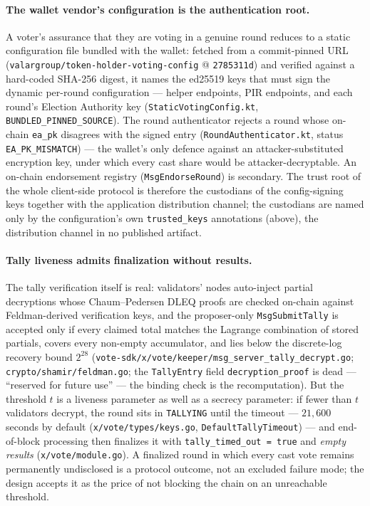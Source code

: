 \documentclass[11pt,a4paper]{article}
\theoremstyle{definition}
\begin{document}
\paragraph{The wallet vendor's configuration is the authentication root.}
A voter's assurance that they are voting in a genuine round reduces to a
static configuration file bundled with the wallet: fetched from a
commit-pinned URL (\texttt{valargroup/token-holder-voting-config} @
\texttt{2785311d}) and verified against a hard-coded SHA-256 digest, it
names the ed25519 keys that must sign the dynamic per-round
configuration --- helper endpoints, PIR endpoints, and each round's
Election Authority key (\texttt{StaticVotingConfig.kt},
\texttt{BUNDLED\_PINNED\_SOURCE}). The round authenticator rejects a round
whose on-chain \texttt{ea\_pk} disagrees with the signed entry
(\texttt{RoundAuthenticator.kt}, status \texttt{EA\_PK\_MISMATCH}) --- the
wallet's only defence against an attacker-substituted encryption key,
under which every cast share would be attacker-decryptable. An on-chain
endorsement registry (\texttt{MsgEndorseRound}) is secondary. The trust
root of the whole client-side protocol is therefore the custodians of the
config-signing keys together with the application distribution channel;
the custodians are named only by the configuration's own
\texttt{trusted\_keys} annotations (above), the distribution channel in
no published artifact.

\paragraph{Tally liveness admits finalization without results.} The tally
verification itself is real: validators' nodes auto-inject partial
decryptions whose Chaum--Pedersen DLEQ proofs are checked on-chain against
Feldman-derived verification keys, and the proposer-only
\texttt{MsgSubmitTally} is accepted only if every claimed total matches
the Lagrange combination of stored partials, covers every non-empty
accumulator, and lies below the discrete-log recovery bound $2^{28}$
(\texttt{vote-sdk/x/vote/keeper/msg\_server\_tally\_decrypt.go};
\texttt{crypto/shamir/feldman.go}; the \texttt{TallyEntry} field
\texttt{decryption\_proof} is dead --- ``reserved for future use'' --- the
binding check is the recomputation). But the threshold $t$ is a liveness
parameter as well as a secrecy parameter: if fewer than $t$ validators
decrypt, the round sits in \texttt{TALLYING} until the timeout ---
$21{,}600$ seconds by default (\texttt{x/vote/types/keys.go},
\texttt{DefaultTallyTimeout}) --- and end-of-block processing then finalizes it
with \texttt{tally\_timed\_out = true} and \emph{empty results}
(\texttt{x/vote/module.go}). A finalized round in which every cast vote
remains permanently undisclosed is a protocol outcome, not an excluded
failure mode; the design accepts it as the price of not blocking the
chain on an unreachable threshold.
\end{document}

